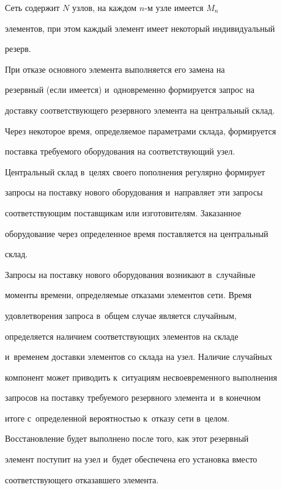    Сеть содержит $N$ узлов, на каждом $n$-м узле имеется $M_n$ 


элементов, при этом каждый элемент имеет некоторый индивидуальный 


резерв.


   


   При отказе основного элемента выполняется его замена на 


резервный (если имеется) и~одновременно формируется запрос на 


доставку соответствующего резервного элемента на центральный склад. 


Через некоторое время, определяемое параметрами склада, формируется 


поставка требуемого оборудования на соответствующий узел. 


Центральный склад в~целях своего пополнения регулярно формирует 


запросы на поставку нового оборудования и~направляет эти запросы 


соответствующим поставщикам или изготовителям. Заказанное 


оборудование через определенное время поставляется на центральный 


склад. 


   


   Запросы на поставку нового оборудования возникают в~случайные 


моменты времени, определяемые отказами элементов сети. Время 


удовлетворения запроса в~общем случае является случайным, 


определяется наличием соответствующих элементов на складе 


и~временем доставки элементов со склада на узел. Наличие случайных 


компонент может приводить к~ситуациям несвоевременного выполнения 


запросов на поставку требуемого резервного элемента и~в конечном 


итоге с~определенной вероятностью к~отказу сети в~целом. 


Восстановление будет выполнено после того, как этот резервный 


элемент поступит на узел и~будет обеспечена его установка вместо 


соответствующего отказавшего элемента.


